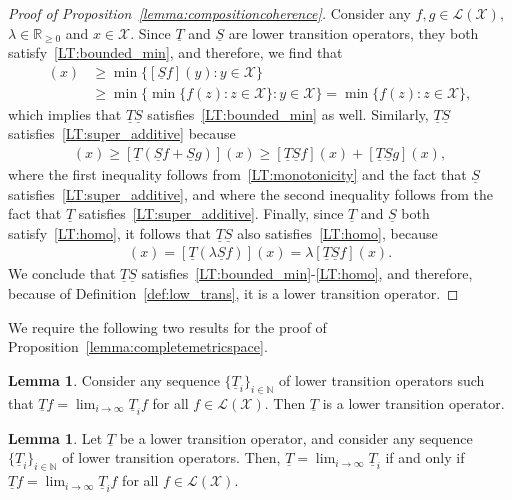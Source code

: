 \documentclass[10pt,a4paper]{paper}
\theoremstyle{definition}
\newtheorem{lemma}[theorem]{Lemma}
\newcommand{\nats}{\mathbb{N}}
\newcommand{\reals}{\mathbb{R}}
\newcommand{\realsnonneg}{\reals_{\geq 0}}
\newcommand{\states}{\mathcal{X}}
\newcommand{\lt}{\underline{T}}
\newcommand{\gambles}{\mathcal{L}}
\newcommand{\gamblesX}{\gambles(\states)}
\begin{document}
\begin{proof}[Proof of Proposition~\ref{lemma:compositioncoherence}]
Consider any $f,g\in\gamblesX$, $\lambda\in\realsnonneg$ and $x\in\states$. Since $\underline{T}$ and $\underline{S}$ are lower transition operators, they both satisfy~\ref{LT:bounded_min}, and therefore, we find that
\begin{align*}
[\underline{T}\underline{S}f](x)
&\geq
\min\{[\underline{S}f](y)\colon y\in\states\}\\
&\geq
\min\{\min\{f(z)\colon z\in\states\}\colon y\in\states\}
=
\min\{f(z)\colon z\in\states\},
\end{align*}
which implies that $\underline{T}\underline{S}$ satisfies~\ref{LT:bounded_min} as well. 
Similarly, $\underline{T}\underline{S}$ satisfies~\ref{LT:super_additive} because
\begin{align*}
[\underline{T}\underline{S}(f+g)](x)
\geq
[\underline{T}(\underline{S}f+\underline{S}g)](x)
\geq
[\underline{T}\underline{S}f](x)
+
[\underline{T}\underline{S}g](x),
\end{align*}
where the first inequality follows from~\ref{LT:monotonicity} and the fact that $\underline{S}$ satisfies~\ref{LT:super_additive}, and where the second inequality follows from the fact that $\underline{T}$ satisfies~\ref{LT:super_additive}.
Finally, since $\underline{T}$ and $\underline{S}$ both satisfy~\ref{LT:homo}, it follows that $\underline{T}\underline{S}$ also satisfies~\ref{LT:homo}, because
\begin{align*}
[\underline{T}\underline{S}(\lambda f)](x)
=
[\underline{T}(\lambda\underline{S}f)](x)
=
\lambda[\underline{T}\underline{S}f](x).
\end{align*}
We conclude that $\underline{T}\underline{S}$ satisfies~\ref{LT:bounded_min}-\ref{LT:homo}, and therefore, because of Definition~\ref{def:low_trans}, it is a lower transition operator.
\end{proof}

We require the following two results for the proof of Proposition~\ref{lemma:completemetricspace}.

\begin{lemma}\cite[Proposition~1]{DeBock:2016}\label{lemma:lowertrans_if_pointwise_limit}
Consider any sequence $\{\lt_i\}_{i\in\nats}$ of lower transition operators such that $\lt f=\lim_{i\to\infty}\lt_i f$ for all $f\in\gamblesX$. Then $\lt$ is a lower transition operator.
\end{lemma}

\begin{lemma}\cite[Proposition~2]{DeBock:2016}\label{lemma:lowertrans_limit_iff_pointwise_limit}
Let $\lt$ be a lower transition operator, and consider any sequence $\{\lt_i\}_{i\in\nats}$ of lower transition operators. Then, $\lt=\lim_{i\to\infty}\lt_i$ if and only if $\lt f=\lim_{i\to\infty}\lt_i f$ for all $f\in\gamblesX$.
\end{lemma}
\end{document}
